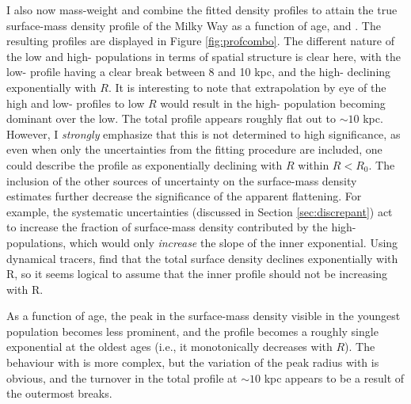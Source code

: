 I also now mass-weight and combine the fitted density profiles to attain the true surface-mass density profile of the Milky Way as a function of age, \feh{} and \afe{}. The resulting profiles are displayed in Figure \ref{fig:profcombo}. The different nature of the low and high-\afe{} populations in terms of spatial structure is clear here, with the low-\afe{} profile having a clear break between 8 and 10 kpc, and the high-\afe{} declining exponentially with $R$. It is interesting to note that extrapolation by eye of the high and low-\afe{} profiles to low $R$ would result in the high-\afe{} population becoming dominant over the low. The total profile appears roughly flat out to $\sim 10$ kpc. However, I \emph{strongly} emphasize that this is not determined to high significance, as even when only the uncertainties from the fitting procedure are included, one could describe the profile as exponentially declining with $R$ within $R < R_0$. The inclusion of the other sources of uncertainty on the surface-mass density estimates further decrease the significance of the apparent flattening. For example, the systematic uncertainties (discussed in Section \ref{sec:discrepant}) act to increase the fraction of surface-mass density contributed by the high-\afe{} populations, which would only \emph{increase} the slope of the inner exponential. Using dynamical tracers, \citet{2013ApJ...779..115B} find that the total surface density declines exponentially with R, so it seems logical to assume that the inner profile should not be increasing with R.

As a function of age, the peak in the surface-mass density visible in the youngest population becomes less prominent, and the profile becomes a roughly single exponential at the oldest ages (i.e., it monotonically decreases with $R$).  The behaviour with \feh{} is more complex, but the variation of the peak radius with \feh{} is obvious, and the turnover in the total profile at $\sim 10$ kpc appears to be a result of the outermost breaks.

